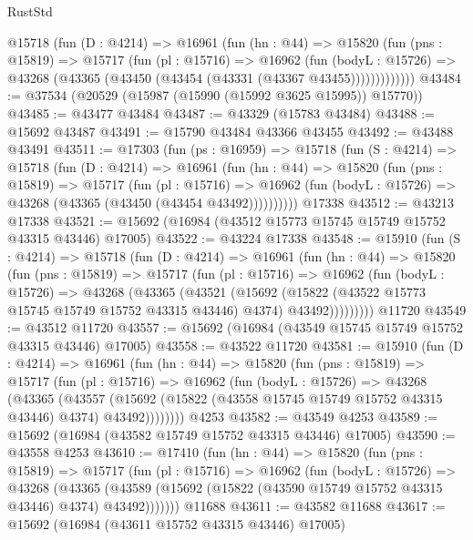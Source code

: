 \begin{lexlean}{RustStd}
\begin{coremodule}
        @15718
          (fun (D : @4214) =>
          @16961
            (fun (hn : @44) =>
            @15820
              (fun (pns : @15819) =>
              @15717
                (fun (pl : @15716) =>
                @16962
                  (fun (bodyL : @15726) =>
                  @43268 (@43365 (@43450 (@43454 (@43331 (@43367 @43455)))))))))))))
@43484 := @37534 (@20529 (@15987 (@15990 (@15992 @3625 @15995)) @15770))
@43485 := @43477 @43484
@43487 := @43329 (@15783 @43484)
@43488 := @15692 @43487
@43491 := @15790 @43484 @43366 @43455
@43492 := @43488 @43491
@43511 := @17303
    (fun (ps : @16959) =>
    @15718
      (fun (S : @4214) =>
      @15718
        (fun (D : @4214) =>
        @16961
          (fun (hn : @44) =>
          @15820
            (fun (pns : @15819) =>
            @15717
              (fun (pl : @15716) =>
              @16962 (fun (bodyL : @15726) => @43268 (@43365 (@43450 (@43454 @43492))))))))))
    @17338
@43512 := @43213 @17338
@43521 := @15692 (@16984 (@43512 @15773 @15745 @15749 @15752 @43315 @43446) @17005)
@43522 := @43224 @17338
@43548 := @15910
    (fun (S : @4214) =>
    @15718
      (fun (D : @4214) =>
      @16961
        (fun (hn : @44) =>
        @15820
          (fun (pns : @15819) =>
          @15717
            (fun (pl : @15716) =>
            @16962
              (fun (bodyL : @15726) =>
              @43268
                (@43365
                  (@43521
                    (@15692
                      (@15822 (@43522 @15773 @15745 @15749 @15752 @43315 @43446) @4374)
                      @43492)))))))))
    @11720
@43549 := @43512 @11720
@43557 := @15692 (@16984 (@43549 @15745 @15749 @15752 @43315 @43446) @17005)
@43558 := @43522 @11720
@43581 := @15910
    (fun (D : @4214) =>
    @16961
      (fun (hn : @44) =>
      @15820
        (fun (pns : @15819) =>
        @15717
          (fun (pl : @15716) =>
          @16962
            (fun (bodyL : @15726) =>
            @43268
              (@43365
                (@43557
                  (@15692 (@15822 (@43558 @15745 @15749 @15752 @43315 @43446) @4374) @43492))))))))
    @4253
@43582 := @43549 @4253
@43589 := @15692 (@16984 (@43582 @15749 @15752 @43315 @43446) @17005)
@43590 := @43558 @4253
@43610 := @17410
    (fun (hn : @44) =>
    @15820
      (fun (pns : @15819) =>
      @15717
        (fun (pl : @15716) =>
        @16962
          (fun (bodyL : @15726) =>
          @43268
            (@43365
              (@43589 (@15692 (@15822 (@43590 @15749 @15752 @43315 @43446) @4374) @43492)))))))
    @11688
@43611 := @43582 @11688
@43617 := @15692 (@16984 (@43611 @15752 @43315 @43446) @17005)

\end{coremodule}
\end{lexlean}

